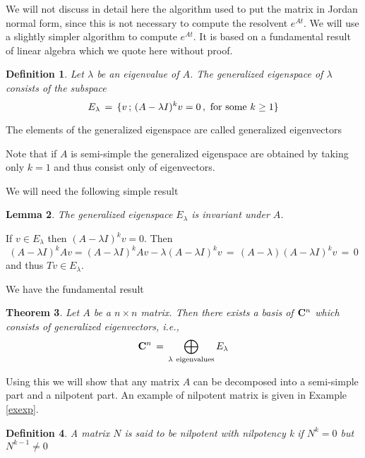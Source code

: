 \documentclass[12pt]{report}
\newcommand{\bC}{{\bf C}}
\newtheorem{theorem}{Theorem}[section]
\newtheorem{lemma}[theorem]{Lemma}
\newtheorem{definition}[theorem]{Definition}
\newcommand{\proof}{\noindent {\em Proof:~}}
\begin{document}
We will not discuss in detail here the algorithm used to put the matrix in 
Jordan normal form, since this is not necessary to compute the resolvent  $e^{At}$.  
We will use a slightly simpler algorithm to compute $e^{At}$.  It is based on a fundamental 
result of linear algebra which we quote here without proof.  


\begin{definition} Let $\lambda$ be an eigenvalue of $A$. The {\em generalized eigenspace} of $\lambda$ consists of the subspace 
\begin{equation}
E_\lambda \,=\, \{ v\,;\, (A-\lambda I)^k v=0\,, {\rm ~for~some~}k \ge 1\}
\end{equation}
\end{definition}
The elements of the generalized eigenspace are called generalized eigenvectors


Note that if $A$ is semi-simple the generalized eigenspace are obtained by taking only $k=1$ 
and thus consist  only of eigenvectors. 

We will need the following simple result

\begin{lemma}\label{invge} The generalized eigenspace $E_\lambda$ is invariant under $A$. 
\end{lemma}

\proof If $v \in E_\lambda$ then $(A-\lambda I)^k v=0$. Then 
\begin{equation}
(A-\lambda I)^k Av =  (A-\lambda I)^k Av - \lambda (A-\lambda I)^k v \,=\, (A-\lambda) (A-\lambda I)^k v\,=\,0
\end{equation}
and thus $Tv \in E_\lambda$. 

We have the fundamental result

\begin{theorem}\label{gendec}  Let $A$ be a $n \times n$ matrix. Then there exists a basis of $\bC^n$ which consists 
of generalized eigenvectors, i.e., 
\begin{equation}
\bC^n \,=\, \bigoplus_{\lambda {\rm ~eigenvalues}} E_\lambda
\end{equation}
\end{theorem}

Using this we will show that any matrix $A$ can be decomposed into a semi-simple part
and a nilpotent part. An example of nilpotent matrix is given in Example \ref{exexp}. 

\begin{definition} {\rm A matrix  $N$ is said to be {\em nilpotent with nilpotency k}
if $N^k=0$ but $N^{k-1}\not =0$
}
\end{definition} 
\end{document}
